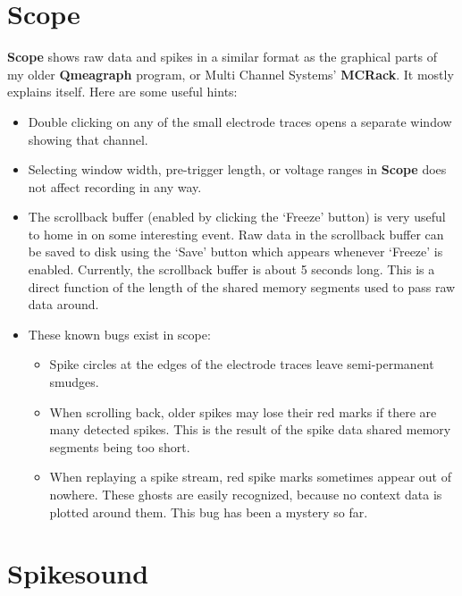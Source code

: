 \documentclass[12pt,oneside]{book}
\def\prog#1{{\bf #1}}
\def\streamtype#1{{\sc #1}\xspace}
\def\raw{\streamtype{raw}}
\def\spike{\streamtype{spike}}
\begin{document}
\section{Scope}

\prog{Scope} shows raw data and spikes in a similar format as the
graphical parts of my older \prog{Qmeagraph} program, or Multi Channel
Systems' \prog{MCRack}. It mostly explains itself. Here are some
useful hints: 
\begin{itemize}
\item Double clicking on any of the small electrode traces opens a
separate window showing that channel.
\item Selecting window width, pre-trigger length, or voltage ranges in
\prog{Scope} does not affect recording in any way.
\item The scrollback buffer (enabled by clicking the `Freeze' button)
is very useful to home in on some interesting event. Raw data in the
scrollback buffer can be saved to disk using the `Save' button which
appears whenever `Freeze' is enabled. Currently, the scrollback buffer
is about 5 seconds long. This is a direct function of the length of
the shared memory segments used to pass \raw data around.
\item These known bugs exist in scope:
\begin{itemize}
\item Spike circles at the edges of the electrode traces leave
semi-permanent smudges.
\item When scrolling back, older spikes may lose their red marks if
there are many detected spikes. This is the result of the \spike data
shared memory segments being too short.
\item When replaying a spike stream, red spike marks sometimes appear
out of nowhere. These ghosts are easily recognized, because no context
data is plotted around them. This bug has been a mystery so far.
\end{itemize}
\end{itemize}

\section{Spikesound}
\end{document}
